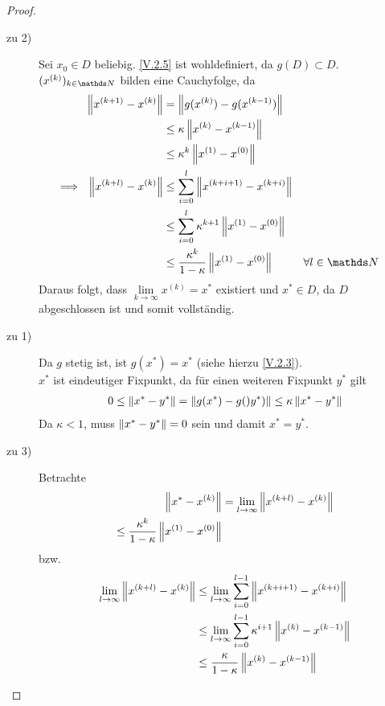 \begin{proof}
	\begin{description}
		\item[zu 2)] Sei $x_0\in D$ beliebig. \eqref{V.2.5} ist wohldefiniert, da $g(D)\subset D$.
		$(x^{(k)})_{k\in\N}$ bilden eine Cauchyfolge, da 
		\begin{align*}
		\nn{x^{(k+1)}-x^{(k)}} &= \nn{g(x^{(k)})-g(x^{(k-1)})} \\
		&\leq \kappa \nn{x^{(k)}-x^{(k-1)}} \\
		&\leq \kappa^k\nn{x^{(1)}-x^{(0)}} \\
		\Longrightarrow~~ \nn{x^{(k+l)}-x^{(k)}} &\leq \sum_{i=0}^{l}\nn{x^{(k+i+1)}-x^{(k+i)}} \\
		&\leq \sum_{i=0}^{l}\kappa^{k+1}\nn{x^{(1)}-x^{(0)}}\\
		&\leq \frac{\kappa^k}{1-\kappa}\nn{x^{(1)}-x^{(0)}}
		&&\forall l\in\N 
		\end{align*}
		Daraus folgt, dass $\lim\limits_{k\rightarrow \infty} x^{(k)}=x^{*} $ existiert 
		und $x^{*}\in D$, da $D$ abgeschlossen ist und somit vollständig.
		
		\item[zu 1)] Da $g$ stetig ist, ist $g(x^{*})=x^{*}$ (siehe hierzu \eqref{V.2.3}). \\
		$x^{*}	$ ist eindeutiger Fixpunkt, da für einen weiteren Fixpunkt $y^{*}$ gilt
		\begin{gather*}
		0\leq \left\| x^{*}-y^{*} \right\| = \left\| g(x^{*})-g()y^{*}) \right\|\leq \kappa \left\| x^{*}-y^{*} \right\|
		\end{gather*}
		Da $\kappa<1$, muss $ \left\| x^{*}-y^{*} \right\|=0$ sein und damit $x^{*}=y^{*}$.
		
		\item[zu 3)] Betrachte 
		\begin{align*}
		\left\| x^{*}-x^{(k)} \right\| &= \lim\limits_{l\rightarrow \infty} \left\| x^{(k+l)}-x^{(k)} \right\| \\
		\leq  \frac{\kappa^k}{1-\kappa} \left\| x^{(1)}- x^{(0)} \right\|
		\end{align*}
		bzw.
		\begin{align*}
		\lim\limits_{l\rightarrow \infty} \left\| x^{(k+l)}-x^{(k)} \right\|
		&\leq \lim\limits_{l\rightarrow \infty} \sum_{i=0}^{l-1}\left\| x^{(k+i+1)}-x^{(k+i)} \right\| \\
		&\leq \lim\limits_{l\rightarrow \infty}\sum_{i=0}^{l-1}\kappa^{i+1} \left\| x^{(k)}-x^{(k-1)} \right\| \\
		&\leq \frac{\kappa}{1-\kappa} \left\| x^{(k)}-x^{(k-1)} \right\| 
		\end{align*}
	\end{description}
\end{proof}

